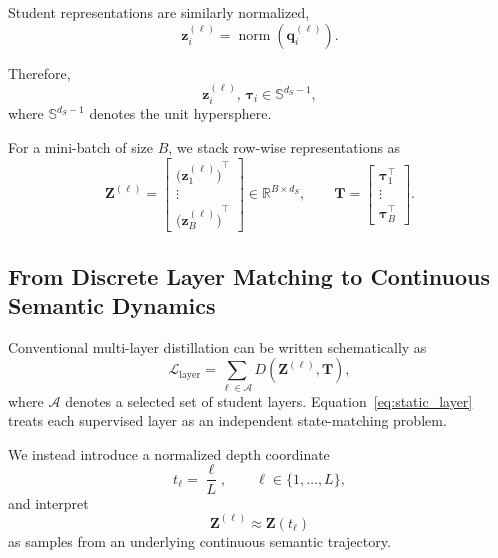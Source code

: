 \documentclass[11pt]{article}
\begin{document}
Student representations are similarly normalized,
\begin{equation}
    \mathbf{z}^{(\ell)}_i
    =
    \operatorname{norm}
    \left(
        \mathbf{q}^{(\ell)}_i
    \right).
    \label{eq:student_norm}
\end{equation}

Therefore,
\begin{equation}
    \mathbf{z}^{(\ell)}_i,\,
    \boldsymbol{\tau}_i
    \in
    \mathbb{S}^{d_S-1},
\end{equation}
where $\mathbb{S}^{d_S-1}$ denotes the unit hypersphere.

For a mini-batch of size $B$, we stack row-wise representations as
\begin{equation}
    \mathbf{Z}^{(\ell)}
    =
    \begin{bmatrix}
        {\bigl(\mathbf{z}^{(\ell)}_1\bigr)}^\top\\
        \vdots\\
        {\bigl(\mathbf{z}^{(\ell)}_B\bigr)}^\top
    \end{bmatrix}
    \in\mathbb{R}^{B\times d_S},
    \qquad
    \mathbf{T}
    =
    \begin{bmatrix}
        \boldsymbol{\tau}_1^\top\\
        \vdots\\
        \boldsymbol{\tau}_B^\top
    \end{bmatrix}.
\end{equation}


\subsection{From Discrete Layer Matching to Continuous Semantic Dynamics}\label{sec:continuous}

Conventional multi-layer distillation can be written schematically as
\begin{equation}
    \mathcal{L}_{\mathrm{layer}}
    =
    \sum_{\ell\in\mathcal{A}}
    D\left(
        \mathbf{Z}^{(\ell)},
        \mathbf{T}
    \right),
    \label{eq:static_layer}
\end{equation}
where $\mathcal{A}$ denotes a selected set of student layers.
Equation~\eqref{eq:static_layer} treats each supervised layer as an
independent state-matching problem.

We instead introduce a normalized depth coordinate
\begin{equation}
    t_\ell=\frac{\ell}{L},
    \qquad
    \ell\in\{1,\ldots,L\},
\end{equation}
and interpret
\begin{equation}
    \mathbf{Z}^{(\ell)}
    \approx
    \mathbf{Z}(t_\ell)
\end{equation}
as samples from an underlying continuous semantic trajectory.
\end{document}
